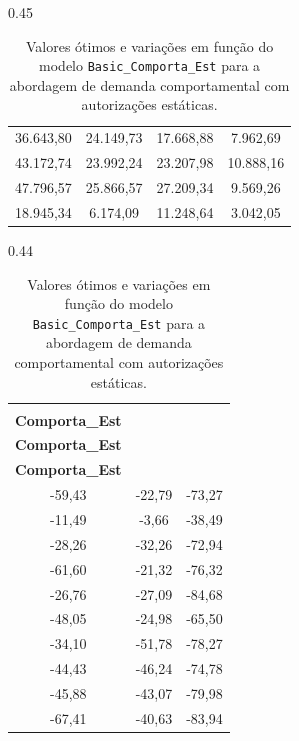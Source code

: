 \begin{table}[H]
\begin{subtable}[t]{0.45\textwidth}
\begin{tabular}{@{}cccc@{}}
			36.643,80  & 24.149,73  & 17.668,88  & 7.962,69   \\
			43.172,74  & 23.992,24  & 23.207,98  & 10.888,16  \\
			47.796,57  & 25.866,57  & 27.209,34  & 9.569,26   \\
			18.945,34  & 6.174,09   & 11.248,64  & 3.042,05   \\
			\bottomrule
		\end{tabular}
		\caption{Z* (\$)}
	\end{subtable}
	\hfill
	\begin{subtable}[t]{0.44\textwidth}
		\centering
		\begin{tabular}{@{}ccc@{}}
			\toprule
			\makecell[c]{\textbf{Fulfill\_}                  \\\textbf{Comporta\_Est}}
			       & \makecell[c]{\textbf{Skipla\_}          \\\textbf{Comporta\_Est}}
			       & \makecell[c]{\textbf{Comp\_}            \\\textbf{Comporta\_Est}} \\
			\midrule
			-59,43 & -22,79 & -73,27 \\
			-11,49 & -3,66  & -38,49 \\
			-28,26 & -32,26 & -72,94 \\
			-61,60 & -21,32 & -76,32 \\
			-26,76 & -27,09 & -84,68 \\
			-48,05 & -24,98 & -65,50 \\
			-34,10 & -51,78 & -78,27 \\
			-44,43 & -46,24 & -74,78 \\
			-45,88 & -43,07 & -79,98 \\
			-67,41 & -40,63 & -83,94 \\
			\bottomrule
		\end{tabular}
		\caption{Variação das diferenças no Z* (\%)}
	\end{subtable}

	\caption{Valores ótimos e variações em função do modelo \texttt{Basic\_Comporta\_Est} para a abordagem de demanda comportamental com autorizações estáticas.}
	\label{tab: tab_Basic_Comporta_Est}
\end{table}


